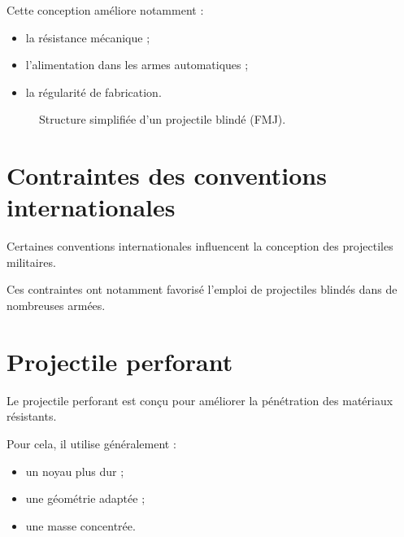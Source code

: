 Cette conception améliore notamment :

\begin{itemize}
    \item la résistance mécanique ;
    \item l'alimentation dans les armes automatiques ;
    \item la régularité de fabrication.
\end{itemize}

\begin{figure}[htbp]
\centering


\caption{Structure simplifiée d'un projectile blindé (FMJ).}
\label{fig:fmj}

\end{figure}

\section{Contraintes des conventions internationales}

Certaines conventions internationales influencent la conception des
projectiles militaires.

Ces contraintes ont notamment favorisé l'emploi de projectiles blindés dans
de nombreuses armées.

\section{Projectile perforant}

Le projectile perforant est conçu pour améliorer la pénétration des matériaux
résistants.

Pour cela, il utilise généralement :

\begin{itemize}
    \item un noyau plus dur ;
    \item une géométrie adaptée ;
    \item une masse concentrée.
\end{itemize}

